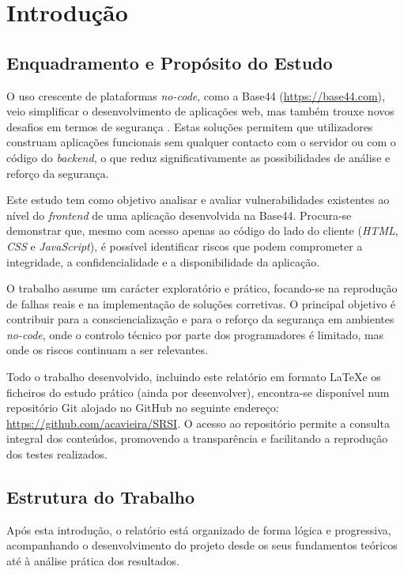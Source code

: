 \section{Introdução}

\subsection{Enquadramento e Propósito do Estudo}

O uso crescente de plataformas \textit{no-code}, como a Base44 (\url{https://base44.com}), veio simplificar o desenvolvimento de aplicações web, mas também trouxe novos desafios em termos de segurança \cite{ref54}. Estas soluções permitem que utilizadores construam aplicações funcionais sem qualquer contacto com o servidor ou com o código do \textit{backend}, o que reduz significativamente as possibilidades de análise e reforço da segurança.

Este estudo tem como objetivo analisar e avaliar vulnerabilidades existentes ao nível do \textit{frontend} de uma aplicação desenvolvida na Base44. Procura-se demonstrar que, mesmo com acesso apenas ao código do lado do cliente (\textit{HTML}, \textit{CSS} e \textit{JavaScript}), é possível identificar riscos que podem comprometer a integridade, a confidencialidade e a disponibilidade da aplicação.

O trabalho assume um carácter exploratório e prático, focando-se na reprodução de falhas reais e na implementação de soluções corretivas. O principal objetivo é contribuir para a consciencialização e para o reforço da segurança em ambientes \textit{no-code}, onde o controlo técnico por parte dos programadores é limitado, mas onde os riscos continuam a ser relevantes.

Todo o trabalho desenvolvido, incluindo este relatório em formato \LaTeX\;e os ficheiros do estudo prático (ainda por desenvolver), encontra-se disponível num repositório Git alojado no GitHub no seguinte endereço: \url{https://github.com/acavieira/SRSI}. O acesso ao repositório permite a consulta integral dos conteúdos, promovendo a transparência e facilitando a reprodução dos testes realizados.

\subsection{Estrutura do Trabalho}

Após esta introdução, o relatório está organizado de forma lógica e progressiva, acompanhando o desenvolvimento do projeto desde os seus fundamentos teóricos até à análise prática dos resultados.

